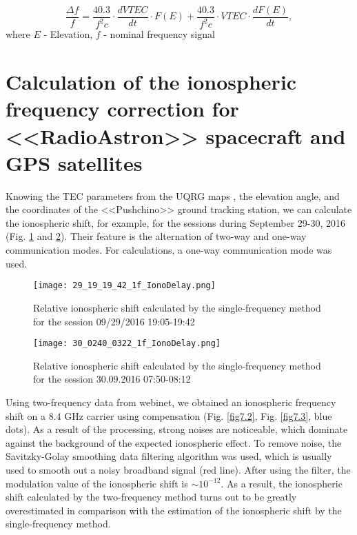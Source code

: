\documentclass[a4paper,english,bopenany]{article}
\begin{document}
\begin{equation}
\frac{\Delta f}{f} = \frac{40.3}{f^{2}c}\cdot\frac{dVTEC}{dt}\cdot F(E) + \frac{40.3}{f^{2}c}\cdot VTEC\cdot \frac{dF(E)}{dt},
\end{equation}
 where $E$ - Elevation, $f$ - nominal frequency signal

\section[Calculation of the ionospheric frequency correction for RA and GPS satellites]{Calculation of the ionospheric frequency correction for <<RadioAstron>> spacecraft and GPS satellites}


Knowing the TEC parameters from the UQRG maps \cite{UQRG}\cite{TECMAP} , the elevation angle, and the coordinates of the <<Pushchino>> ground tracking station, we can calculate the ionospheric shift, for example, for the sessions during September 29-30, 2016 (Fig. \ref{fig7.1} and \ref{fig7}). Their feature is the alternation of two-way and one-way communication modes. For calculations, a one-way communication mode was used.


\begin{figure}[ht!] 

	\centering
	\texttt{[image: 29\_19\_19\_42\_1f\_IonoDelay.png]}
	\caption{Relative ionospheric shift calculated by the single-frequency method for the session 09/29/2016 19:05-19:42} 
	\label{fig7.1}
	\vspace{4ex} 
\end{figure}
\begin{figure}[ht!] 	

		\centering
		\texttt{[image: 30\_0240\_0322\_1f\_IonoDelay.png]}
		\caption{Relative ionospheric shift calculated by the single-frequency method for the session 30.09.2016 07:50-08:12}
		\vspace{4ex}
				\label{fig7}

	
\end{figure}


Using two-frequency data from webinet, we obtained an ionospheric frequency shift on a 8.4 GHz carrier using compensation (Fig. \ref{fig7.2}, Fig. \ref{fig7.3}, blue dots). As a result of the processing, strong noises are noticeable, which dominate against the background of the expected ionospheric effect. To remove noise, the Savitzky-Golay smoothing data filtering algorithm \cite{savgol} was used, which is usually used to smooth out a noisy broadband signal (red line). After using the filter, the modulation value of the ionospheric shift is $ \sim 10 ^ {- 12} $. As a result, the ionospheric shift calculated by the two-frequency method turns out to be greatly overestimated in comparison with the estimation of the ionospheric shift by the single-frequency method.
\end{document}
